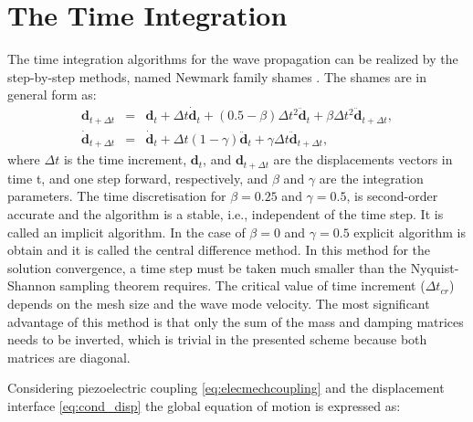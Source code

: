 \section{The Time Integration}
\label{sec:time}

The time integration algorithms for the wave propagation can be realized by the step-by-step methods, named Newmark family shames \cite{newmark1959method}.
The shames are in general form as:
\begin{eqnarray}
	\label{eq:u_newmark}
	\textbf{d}_{t+\Delta t} & = & \textbf{d}_{t} +\Delta t \dot{\textbf{d}}_{t} + \left( 0.5 - \beta \right)\Delta t^2\ddot{\textbf{d}}_{t} + \beta \Delta t^2\ddot{\textbf{d}}_{t+\Delta t},\\
	\dot{\textbf{d}}_{t+\Delta t} & = & \dot{\textbf{d}}_{t} + \Delta t\left(1-\gamma\right)\ddot{\textbf{d}}_{t} + \gamma \Delta t\ddot{\textbf{d}}_{t+\Delta t},
\end{eqnarray}
where \(\Delta t\) is the time increment, \(\textbf{d}_{t}\), and \(\textbf{d}_{t+\Delta t}\) are the displacements vectors in time t, and one step forward, respectively, and \(\beta\) and \(\gamma\) are the integration parameters.
The time discretisation for \(\beta = 0.25\) and \(\gamma = 0.5\), is second-order accurate and the algorithm is a stable, i.e., independent of the time step. It is called an implicit algorithm.
In the case of \(\beta = 0\) and \(\gamma = 0.5\) explicit algorithm is obtain and it is called the central difference method.
In this method for the solution convergence, a time step must be taken much smaller than the Nyquist-Shannon sampling theorem requires.
The critical value of time increment (\(\Delta t_{cr}\)) depends on the mesh size and the wave mode velocity.
The most significant advantage of this method is that only the sum of the mass and damping matrices needs to be inverted, which is trivial in the presented scheme because both matrices are diagonal.

Considering piezoelectric coupling \ref{eq:elecmechcoupling} and the displacement interface \ref{eq:cond_disp} the global equation of motion is expressed as:


